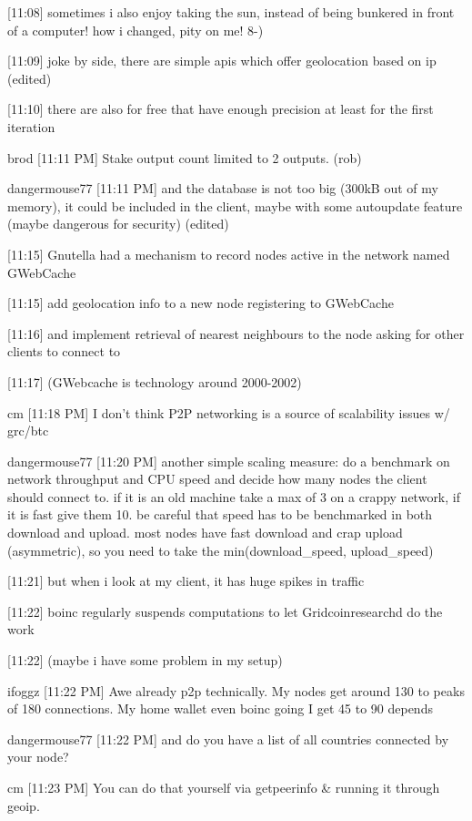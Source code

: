 {[11:08] 
sometimes i also enjoy taking the sun, instead of being bunkered in front of a computer! how i changed, pity on me! 8-)


[11:09] 
joke by side, there are simple apis which offer geolocation based on ip (edited)


[11:10] 
there are also for free that have enough precision at least for the first iteration


brod 
[11:11 PM] 
Stake output count limited to 2 outputs. (rob)


dangermouse77 [11:11 PM] 
and the database is not too big (300kB out of my memory), it could be included in the client, maybe with some autoupdate feature (maybe dangerous for security) (edited)


[11:15] 
Gnutella had a mechanism to record nodes active in the network named GWebCache


[11:15] 
add geolocation info to a new node registering to GWebCache


[11:16] 
and implement retrieval of nearest neighbours to the node asking for other clients to connect to


[11:17] 
(GWebcache is technology around 2000-2002)


cm 
[11:18 PM] 
I don't think P2P networking is a source of scalability issues w/ grc/btc


dangermouse77 [11:20 PM] 
another simple scaling measure: do a benchmark on network throughput and CPU speed and decide how many nodes the client should connect to. if it is an old machine take a max of 3 on a crappy network, if it is fast give them 10. be careful that speed has to be benchmarked in both download and upload. most nodes have fast download and crap upload (asymmetric), so you need to take the min(download_speed, upload_speed)


[11:21] 
but when i look at my client, it has huge spikes in traffic


[11:22] 
boinc regularly suspends computations to let Gridcoinresearchd do the work


[11:22] 
(maybe i have some problem in my setup)


ifoggz
[11:22 PM] 
Awe already p2p technically. My nodes get around 130 to peaks of 180 connections. My home wallet even boinc going I get 45 to 90 depends


dangermouse77 [11:22 PM] 
and do you have a list of all countries connected by your node?


cm 
[11:23 PM] 
You can do that yourself via getpeerinfo & running it through geoip.


}
